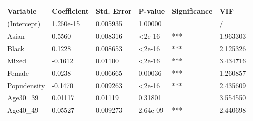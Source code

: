 \begin{table}[]
\centering
\begin{tabular}{|llllll|}
\hline
\multicolumn{1}{|l|}{\textbf{Variable}} & \multicolumn{1}{l|}{\textbf{Coefficient}} & \multicolumn{1}{l|}{\textbf{Std. Error}} & \multicolumn{1}{l|}{\textbf{P-value}} & \multicolumn{1}{l|}{\textbf{Significance}} & \textbf{VIF} \\ \hline
\multicolumn{1}{|l|}{(Intercept)}       & \multicolumn{1}{l|}{1.250e-15}            & \multicolumn{1}{l|}{0.005935}                    & \multicolumn{1}{l|}{1.00000}          & \multicolumn{1}{l|}{}                      & /            \\ \hline
\multicolumn{1}{|l|}{Asian}             & \multicolumn{1}{l|}{0.5560}               & \multicolumn{1}{l|}{0.008316}                    & \multicolumn{1}{l|}{\textless 2e-16}  & \multicolumn{1}{l|}{***}                   & 1.963303     \\ \hline
\multicolumn{1}{|l|}{Black}             & \multicolumn{1}{l|}{0.1228}               & \multicolumn{1}{l|}{0.008653}                    & \multicolumn{1}{l|}{\textless 2e-16}  & \multicolumn{1}{l|}{***}                   & 2.125326     \\ \hline
\multicolumn{1}{|l|}{Mixed}             & \multicolumn{1}{l|}{-0.1612}              & \multicolumn{1}{l|}{0.01100}                    & \multicolumn{1}{l|}{\textless 2e-16}  & \multicolumn{1}{l|}{***}                   & 3.434716     \\ \hline
\multicolumn{1}{|l|}{Female}            & \multicolumn{1}{l|}{0.0238}               & \multicolumn{1}{l|}{0.006665}                    & \multicolumn{1}{l|}{0.00036}          & \multicolumn{1}{l|}{***}                   & 1.260857     \\ \hline
\multicolumn{1}{|l|}{Popudensity}       & \multicolumn{1}{l|}{-0.1470}              & \multicolumn{1}{l|}{0.009263}                    & \multicolumn{1}{l|}{\textless 2e-16}  & \multicolumn{1}{l|}{***}                   & 2.435609     \\ \hline
\multicolumn{1}{|l|}{Age30\_39}         & \multicolumn{1}{l|}{0.01117}              & \multicolumn{1}{l|}{0.01119}                    & \multicolumn{1}{l|}{0.31801}          & \multicolumn{1}{l|}{}                      & 3.554550     \\ \hline
\multicolumn{1}{|l|}{Age40\_49}         & \multicolumn{1}{l|}{0.05527}              & \multicolumn{1}{l|}{0.009273}                    & \multicolumn{1}{l|}{2.64e-09}         & \multicolumn{1}{l|}{***}                   & 2.440698     \\ \hline

\end{tabular}
\end{table}
